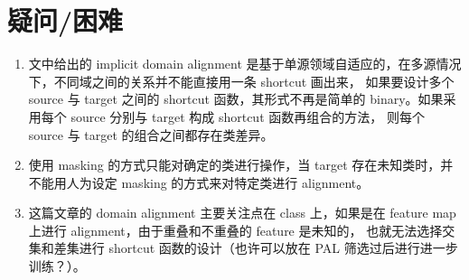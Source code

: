 \documentclass[UTF8]{ctexart}
\begin{document}
    \section{疑问/困难}
        \begin{enumerate}
            \item 文中给出的 implicit domain alignment 是基于单源领域自适应的，在多源情况下，不同域之间的关系并不能直接用一条 shortcut 画出来，
                如果要设计多个 source 与 target 之间的 shortcut 函数，其形式不再是简单的 binary。如果采用每个 source 分别与 target 构成 shortcut 函数再组合的方法，
                则每个 source 与 target 的组合之间都存在类差异。
            \item 使用 masking 的方式只能对确定的类进行操作，当 target 存在未知类时，并不能用人为设定 masking 的方式来对特定类进行 alignment。
            \item 这篇文章的 domain alignment 主要关注点在 class 上，如果是在 feature map 上进行 alignment，由于重叠和不重叠的 feature 是未知的，
            也就无法选择交集和差集进行 shortcut 函数的设计（也许可以放在 PAL 筛选过后进行进一步训练？）。
        \end{enumerate}
\end{document}
